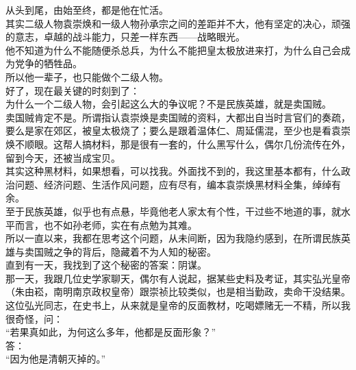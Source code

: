 \begin{multicols}{\theparacolNo}
从头到尾，由始至终，都是他在忙活。\\

其实二级人物袁崇焕和一级人物孙承宗之间的差距并不大，他有坚定的决心，顽强的意志，卓越的战斗能力，只差一样东西——战略眼光。\\

他不知道为什么不能随便杀总兵，为什么不能把皇太极放进来打，为什么自己会成为党争的牺牲品。\\

所以他一辈子，也只能做个二级人物。\\

好了，现在最关键的时刻到了：\\

为什么一个二级人物，会引起这么大的争议呢？不是民族英雄，就是卖国贼。\\

卖国贼肯定不是。所谓指认袁崇焕是卖国贼的资料，大都出自当时言官们的奏疏，要么是家在郊区，被皇太极烧了；要么是跟着温体仁、周延儒混，至少也是看袁崇焕不顺眼。这帮人搞材料，那是很有一套的，什么黑写什么，偶尔几份流传在外，留到今天，还被当成宝贝。\\

其实这种黑材料，如果想看，可以找我。外面找不到的，我这里基本都有，什么政治问题、经济问题、生活作风问题，应有尽有，编本袁崇焕黑材料全集，绰绰有余。\\

至于民族英雄，似乎也有点悬，毕竟他老人家太有个性，干过些不地道的事，就水平而言，也不如孙老师，实在有点勉为其难。\\

所以一直以来，我都在思考这个问题，从未间断，因为我隐约感到，在所谓民族英雄与卖国贼之争的背后，隐藏着不为人知的秘密。\\

直到有一天，我找到了这个秘密的答案：阴谋。\\

那一天，我跟几位史学家聊天，偶尔有人说起，据某些史料及考证，其实弘光皇帝（朱由崧，南明南京政权皇帝）跟崇祯比较类似，也是相当勤政，卖命干没结果。\\

这位弘光同志，在史书上，从来就是皇帝的反面教材，吃喝嫖赌无一不精，所以我很奇怪，问：\\

“若果真如此，为何这么多年，他都是反面形象？”\\

答：\\

“因为他是清朝灭掉的。”\\


\end{multicols}
